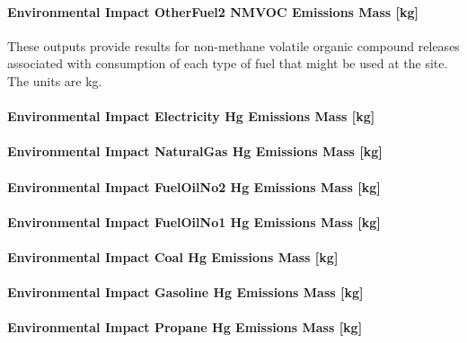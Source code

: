 \paragraph{Environmental Impact OtherFuel2 NMVOC Emissions Mass {[}kg{]}}\label{environmental-impact-otherfuel2-nmvoc-emissions-mass-kg}

These outputs provide results for non-methane volatile organic compound releases associated with consumption of each type of fuel that might be used at the site.~ The units are kg.

\paragraph{Environmental Impact Electricity Hg Emissions Mass {[}kg{]}}\label{environmental-impact-electricity-hg-emissions-mass-kg}

\paragraph{Environmental Impact NaturalGas Hg Emissions Mass {[}kg{]}}\label{environmental-impact-natural-gas-hg-emissions-mass-kg}

\paragraph{Environmental Impact FuelOilNo2 Hg Emissions Mass {[}kg{]}}\label{environmental-impact-fuel-oil-2-hg-emissions-mass-kg}

\paragraph{Environmental Impact FuelOilNo1 Hg Emissions Mass {[}kg{]}}\label{environmental-impact-fuel-oil-1-hg-emissions-mass-kg}

\paragraph{Environmental Impact Coal Hg Emissions Mass {[}kg{]}}\label{environmental-impact-coal-hg-emissions-mass-kg}

\paragraph{Environmental Impact Gasoline Hg Emissions Mass {[}kg{]}}\label{environmental-impact-gasoline-hg-emissions-mass-kg}

\paragraph{Environmental Impact Propane Hg Emissions Mass {[}kg{]}}\label{environmental-impact-propane-hg-emissions-mass-kg}

